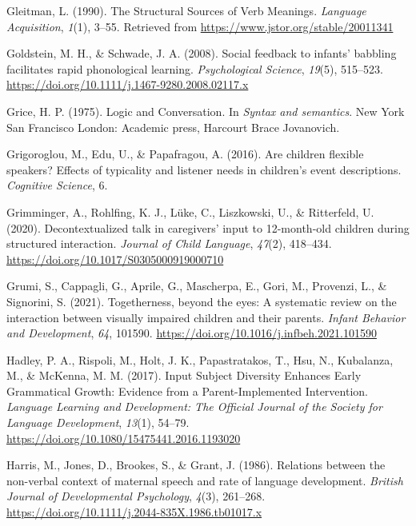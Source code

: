 \documentclass[
  man]{apa6}
\newlength{\cslhangindent}
\newlength{\cslentryspacingunit} %
\newenvironment{CSLReferences}[2] %
 {%
  \setlength{\parindent}{0pt}
  \ifodd #1
  \let\oldpar\par
  \def\par{\hangindent=\cslhangindent\oldpar}
  \fi
  \setlength{\parskip}{#2\cslentryspacingunit}
 }%
 {}
\begin{document}
\begin{CSLReferences}{1}{0}
\leavevmode{}%
Gleitman, L. (1990). The {Structural} {Sources} of {Verb} {Meanings}. \emph{Language Acquisition}, \emph{1}(1), 3--55. Retrieved from \url{https://www.jstor.org/stable/20011341}

\leavevmode{}%
Goldstein, M. H., \& Schwade, J. A. (2008). Social feedback to infants' babbling facilitates rapid phonological learning. \emph{Psychological Science}, \emph{19}(5), 515--523. \url{https://doi.org/10.1111/j.1467-9280.2008.02117.x}

\leavevmode{}%
Grice, H. P. (1975). Logic and {Conversation}. In \emph{Syntax and semantics}. New York San Francisco London: Academic press, Harcourt Brace Jovanovich.

\leavevmode{}%
Grigoroglou, M., Edu, U., \& Papafragou, A. (2016). Are children flexible speakers? {Effects} of typicality and listener needs in children's event descriptions. \emph{Cognitive Science}, 6.

\leavevmode{}%
Grimminger, A., Rohlfing, K. J., Lüke, C., Liszkowski, U., \& Ritterfeld, U. (2020). Decontextualized talk in caregivers' input to 12-month-old children during structured interaction. \emph{Journal of Child Language}, \emph{47}(2), 418--434. \url{https://doi.org/10.1017/S0305000919000710}

\leavevmode{}%
Grumi, S., Cappagli, G., Aprile, G., Mascherpa, E., Gori, M., Provenzi, L., \& Signorini, S. (2021). Togetherness, beyond the eyes: {A} systematic review on the interaction between visually impaired children and their parents. \emph{Infant Behavior and Development}, \emph{64}, 101590. \url{https://doi.org/10.1016/j.infbeh.2021.101590}

\leavevmode{}%
Hadley, P. A., Rispoli, M., Holt, J. K., Papastratakos, T., Hsu, N., Kubalanza, M., \& McKenna, M. M. (2017). Input {Subject} {Diversity} {Enhances} {Early} {Grammatical} {Growth}: {Evidence} from a {Parent}-{Implemented} {Intervention}. \emph{Language Learning and Development: The Official Journal of the Society for Language Development}, \emph{13}(1), 54--79. \url{https://doi.org/10.1080/15475441.2016.1193020}

\leavevmode{}%
Harris, M., Jones, D., Brookes, S., \& Grant, J. (1986). Relations between the non-verbal context of maternal speech and rate of language development. \emph{British Journal of Developmental Psychology}, \emph{4}(3), 261--268. \url{https://doi.org/10.1111/j.2044-835X.1986.tb01017.x}


\end{CSLReferences}
\end{document}
